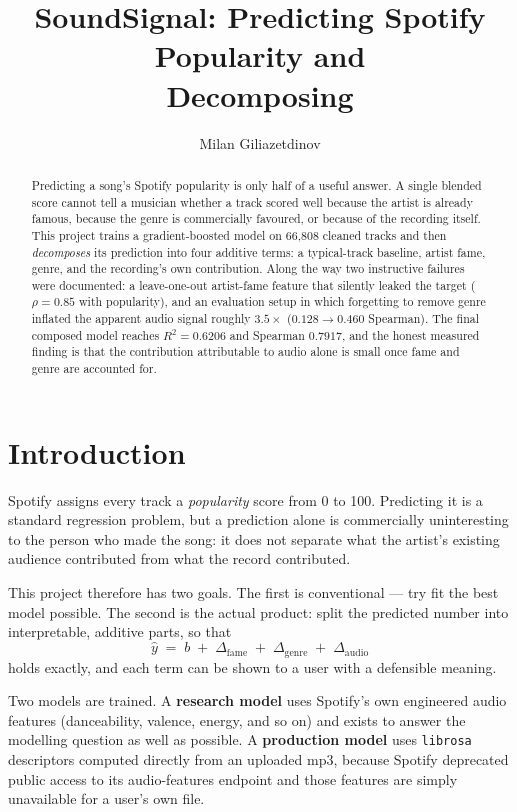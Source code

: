 \documentclass[10pt,twocolumn]{article}
\title{\vspace{-1.5em}\textbf{SoundSignal: Predicting Spotify Popularity and\\
Decomposing}\vspace{-0.5em}}
\author{Milan Giliazetdinov}
\date{}
\begin{document}
\maketitle

\begin{abstract}
\noindent
Predicting a song's Spotify popularity is only half of a useful answer. A single
blended score cannot tell a musician whether a track scored well because the
artist is already famous, because the genre is commercially favoured, or because
of the recording itself. This project trains a gradient-boosted model on 66{,}808
cleaned tracks and then \emph{decomposes} its prediction into four additive
terms: a typical-track baseline, artist fame, genre, and the recording's own
contribution. Along the way two instructive failures were documented: a
leave-one-out artist-fame feature that silently leaked the target
($\rho = 0.85$ with popularity), and an evaluation setup in which forgetting to
remove genre inflated the apparent audio signal roughly $3.5\times$
($0.128 \rightarrow 0.460$ Spearman). The final composed model reaches
$R^2 = 0.6206$ and Spearman $0.7917$, and the honest measured finding is that
the contribution attributable to audio alone is small once fame and genre are
accounted for.
\end{abstract}

\section{Introduction}

Spotify assigns every track a \emph{popularity} score from 0 to 100. Predicting
it is a standard regression problem, but a prediction alone is commercially
uninteresting to the person who made the song: it does not separate what the
artist's existing audience contributed from what the record contributed.

This project therefore has two goals. The first is conventional --- try fit the best
model possible. The second is the actual product: split the
predicted number into interpretable, additive parts, so that
\begin{equation}
\hat{y} \;=\; b \;+\; \Delta_{\text{fame}} \;+\; \Delta_{\text{genre}} \;+\; \Delta_{\text{audio}}
\label{eq:decomp}
\end{equation}
holds exactly, and each term can be shown to a user with a defensible meaning.

Two models are trained. A \textbf{research model} uses Spotify's own engineered
audio features (danceability, valence, energy, and so on) and exists to answer
the modelling question as well as possible. A \textbf{production model} uses
\texttt{librosa} descriptors computed directly from an uploaded mp3, because
Spotify deprecated public access to its audio-features endpoint and those
features are simply unavailable for a user's own file.
\end{document}
